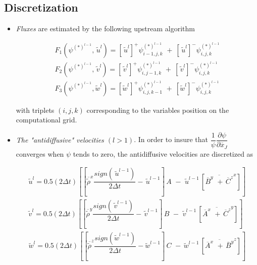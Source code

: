 \subsection{Discretization}

\begin{itemize}

\item {\em Fluxes } are estimated by the following upstream algorithm

\begin{eqnarray}
\label{flux1}
F_1(\psi^{(*)^{l-1}}, \,\tilde{u}^{l}) = [\,\tilde{u}^{l}]^{+}
\psi^{(*)^{l-1}}_{i-1,j,k}\,
\, + \ [\,\tilde{u}^{l}]^{-}
\psi^{(*)^{l-1}}_{i,j,k}\\
\label{flux2}
F_2(\psi^{(*)^{l-1}}, \,\tilde{v}^{l}) = [\,\tilde{v}^{l}]^{+}
\psi^{(*)^{l-1}}_{i,j-1,k}\,
\, + \ [\,\tilde{v}^{l}]^{-}
\psi^{(*)^{l-1}}_{i,j,k}\\
\label{flux3}
F_3(\psi^{(*)^{l-1}}, \tilde{w}^{l}) = [\tilde{w}^{l}]^{+}
\psi^{(*)^{l-1}}_{i,j,k-1}\,
\, + \ [\tilde{w}^{l}]^{-}
\psi^{(*)^{l-1}}_{i,j,k}
\end{eqnarray}

\noindent with triplets $(i,j,k)$ corresponding to the variables position
on the computational grid.

\item {\em The "antidiffusive" velocities $(l>1)$}. In order to insure
that $\dfrac{1}{\psi} \dfrac{\partial \psi}{\partial \overline{x}_J}$
converges when $\psi$ tends to zero, the antidiffusive velocities are
discretized as

\begin{eqnarray}
\tilde{u}^{l}  =  0.5(2\Delta t) \left[{
\left[ \overline{\tilde{\rho}}^{x} \dfrac{sign(\,\tilde{u}^{l-1})}{2\Delta t}
                                      - \,\tilde{u}^{l-1}  \right] \, A \,
\, - \, {\,\tilde{u}^{l-1}}\,
\left[\overline{ \overline{B}^y \,\,+ \, \overline{C}^z }^{x} \right]}\right] \\
\tilde{v}^{l}  =  0.5(2\Delta t) \left[{
\left[ \overline{\tilde{\rho}}^{y} \dfrac{sign(\,\tilde{v}^{l-1})}{2\Delta t}
                                      - \,\tilde{v}^{l-1}  \right] \, B \,
\, - \, {\,\tilde{v}^{l-1}}\,
\left[\overline{ \overline{A}^x \,\,+ \, \overline{C}^z }^{y} \right]}\right] \\
\tilde{w}^{l}  =  0.5(2\Delta t) \left[{
\left[ \overline{\tilde{\rho}}^{z} \dfrac{sign(  \tilde{w}^{l-1})}{2\Delta t}
                                      -   \tilde{w}^{l-1}  \right] \, C \,
\, - \, {  \tilde{w}^{l-1}}\,
\left[\overline{ \overline{A}^x \,\,+ \, \overline{B}^y }^{z} \right]}\right]
\end{eqnarray}



\end{itemize}
